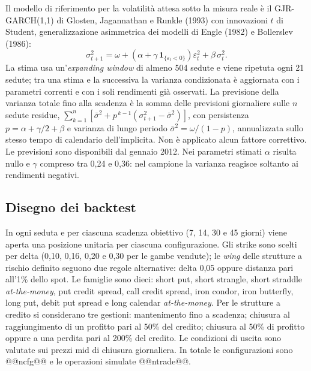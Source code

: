 \documentclass[11pt,a4paper]{article}
\begin{document}
Il modello di riferimento per la volatilità attesa sotto la misura reale è il GJR-GARCH(1,1) di Glosten, Jagannathan e Runkle (1993) con innovazioni $t$ di Student, generalizzazione asimmetrica dei modelli di Engle (1982) e Bollerslev (1986):
\begin{equation}
\sigma^2_{t+1} = \omega + \left(\alpha + \gamma\,\mathbf{1}_{\{\varepsilon_t<0\}}\right)\varepsilon_t^2 + \beta\,\sigma_t^2 .
\end{equation}
La stima usa un'\emph{expanding window} di almeno 504 sedute e viene ripetuta ogni 21 sedute; tra una stima e la successiva la varianza condizionata è aggiornata con i parametri correnti e con i soli rendimenti già osservati. La previsione della varianza totale fino alla scadenza è la somma delle previsioni giornaliere sulle $n$ sedute residue, $\sum_{k=1}^{n}\left[\bar\sigma^2 + p^{\,k-1}(\sigma^2_{t+1}-\bar\sigma^2)\right]$, con persistenza $p=\alpha+\gamma/2+\beta$ e varianza di lungo periodo $\bar\sigma^2=\omega/(1-p)$, annualizzata sullo stesso tempo di calendario dell'implicita. Non è applicato alcun fattore correttivo. Le previsioni sono disponibili dal gennaio 2012. Nei parametri stimati $\alpha$ risulta nullo e $\gamma$ compreso tra 0{,}24 e 0{,}36: nel campione la varianza reagisce soltanto ai rendimenti negativi.

\subsection{Disegno dei backtest}

In ogni seduta e per ciascuna scadenza obiettivo (7, 14, 30 e 45 giorni) viene aperta una posizione unitaria per ciascuna configurazione. Gli strike sono scelti per delta (0{,}10, 0{,}16, 0{,}20 e 0{,}30 per le gambe vendute); le \emph{wing} delle strutture a rischio definito seguono due regole alternative: delta 0{,}05 oppure distanza pari all'1\% dello spot. Le famiglie sono dieci: short put, short strangle, short straddle \emph{at-the-money}, put credit spread, call credit spread, iron condor, iron butterfly, long put, debit put spread e long calendar \emph{at-the-money}. Per le strutture a credito si considerano tre gestioni: mantenimento fino a scadenza; chiusura al raggiungimento di un profitto pari al 50\% del credito; chiusura al 50\% di profitto oppure a una perdita pari al 200\% del credito. Le condizioni di uscita sono valutate sui prezzi mid di chiusura giornaliera. In totale le configurazioni sono @@ncfg@@ e le operazioni simulate @@ntrade@@.
\end{document}
